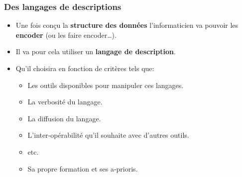 \subsubsection{Des langages de descriptions}

\begin{slide}
	\begin{itemize}
		\item Une fois conçu la \textbf{structure des données} l'informaticien va pouvoir les \textbf{encoder} (ou les faire encoder…).
		\item Il va pour cela utiliser un \textbf{langage de description}.
		\item Qu'il choisira en fonction de critères tels que:
			\begin{itemize}
				\item Les outils disponibles pour manipuler ces langages.
				\item La verbosité du langage.
				\item La diffusion du langage.
				\item L'inter-opérabilité qu'il souhaite avec d'autres outils.
				\item etc.
				\item Sa propre formation et ses a-prioris.
			\end{itemize}
	\end{itemize}
\end{slide}

\begin{slide}

		\beamerdefaultoverlayspecification{}

		
		
\end{slide}

